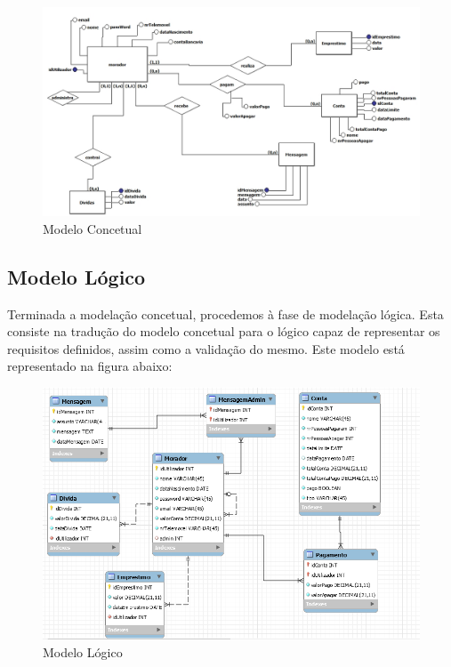 \begin{figure}[htb!]
	\includegraphics[scale=0.5]{imagens/bd/modeloconcetual}  
	\caption{Modelo Concetual}  
\end{figure}

\newpage

\subsection{Modelo Lógico}

Terminada a modelação concetual, procedemos à fase de modelação lógica. Esta consiste na tradução do modelo concetual para o lógico capaz de representar os requisitos definidos, assim como a validação do mesmo. Este modelo está representado na figura abaixo: 

\begin{figure}[htb!]
	\includegraphics[scale=0.7]{imagens/bd/modelologico}  
	\caption{Modelo Lógico}  
\end{figure}

